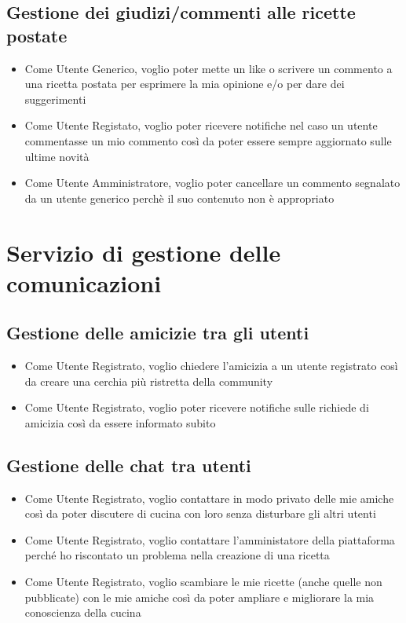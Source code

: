 \documentclass{article}
\begin{document}
\subsection{Gestione dei giudizi/commenti alle ricette postate}
\begin{itemize}
    \item Come Utente Generico, voglio poter mette un like o scrivere un commento a una ricetta postata per 
    esprimere la mia opinione e/o per dare dei suggerimenti
    \item Come Utente Registato, voglio poter ricevere notifiche nel caso un utente commentasse un mio commento 
    così da poter essere sempre aggiornato sulle ultime novità
    \item Come Utente Amministratore, voglio poter cancellare un commento segnalato da un utente generico perchè 
    il suo contenuto non è appropriato 
\end{itemize}

\section{Servizio di gestione delle comunicazioni}
\subsection{Gestione delle amicizie tra gli utenti}
\begin{itemize}
    \item Come Utente Registrato, voglio chiedere l'amicizia a un utente registrato così da creare una cerchia 
    più ristretta della community
    \item Come Utente Registrato, voglio poter ricevere notifiche sulle richiede di amicizia così da essere 
    informato subito
\end{itemize}

\subsection{Gestione delle chat tra utenti}
\begin{itemize}
    \item Come Utente Registrato, voglio contattare in modo privato delle mie amiche così da poter discutere di 
    cucina con loro senza disturbare gli altri utenti
    \item Come Utente Registrato, voglio contattare l'amministatore della piattaforma perché ho riscontato un 
    problema nella creazione di una ricetta
    \item Come Utente Registrato, voglio scambiare le mie ricette (anche quelle non pubblicate) con le mie amiche 
    così da poter ampliare e migliorare la mia conoscienza della cucina    
\end{itemize}
\end{document}
